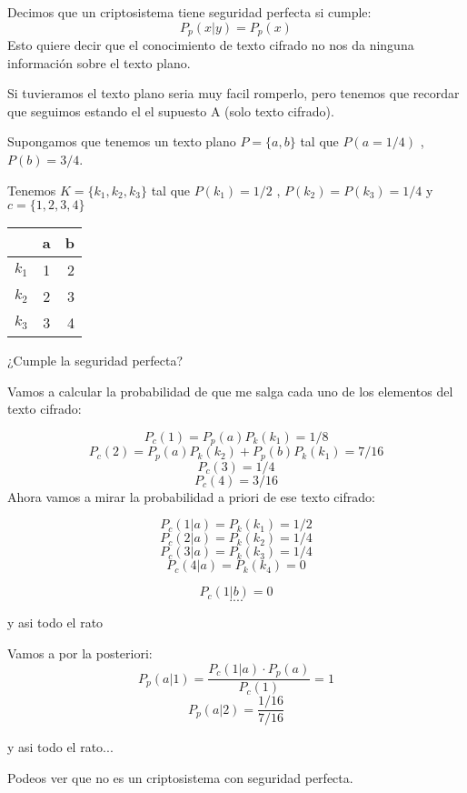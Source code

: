 \begin{defn}
	Decimos que un criptosistema tiene seguridad perfecta si cumple:
	$$P_p(x|y) = P_p(x)$$
	Esto quiere decir que el conocimiento de texto cifrado no nos da ninguna información sobre el texto plano.
\end{defn}

 Si tuvieramos el texto plano seria muy facil romperlo, pero tenemos que recordar que seguimos estando el el supuesto A (solo texto cifrado).

\begin{example}
	Supongamos que tenemos un texto plano $P=\{a,b\}$ tal que $P(a = 1/4)$ , $P(b) = 3/4$.
	
	Tenemos $K=\{k_1,k_2,k_3\}$ tal que $P(k_1) = 1/2$ , $P(k_2) = P(k_3) = 1/4$ y $c = \{1,2,3,4\}$

	
\begin{center}
		
	\begin{tabular}{l | c  r}
		  & a & b\\
		\hline
		$k_1$ & 1 & 2 \\
		$k_2$ & 2 & 3 \\
		$k_3$ & 3 & 4 \\
	\end{tabular}
\end{center}
	
		¿Cumple la seguridad perfecta?
		
		Vamos a calcular la probabilidad de que me salga cada uno de los elementos del texto cifrado:
	
	$$P_c(1) = P_p(a) P_k(k_1) = 1/8$$
	$$P_c(2) = P_p(a) P_k(k_2) + P_p(b) P_k(k_1) = 7/16$$
	$$P_c(3)= 1/4$$
	$$P_c(4) = 3/16$$
	Ahora vamos a mirar la probabilidad a priori de ese texto cifrado:
	
	$$P_c(1|a) = P_k(k_1) = 1/2$$
	$$P_c(2|a) = P_k(k_2) = 1/4$$
	$$P_c(3|a) = P_k(k_3) = 1/4$$
	$$P_c(4|a) = P_k(k_4) = 0$$
	
	$$P_c(1|b) = 0$$
	$$....$$
	
	y asi todo el rato
	
	Vamos a por la posteriori:
	$$P_p(a|1) = \frac{P_c(1|a) \cdot P_p(a)}{P_c(1)} = 1$$
	$$P_p(a|2) = \frac{1/16}{7/16}$$
	
	y asi todo el rato...
	
	Podeos ver que no es un criptosistema con seguridad perfecta.
\end{example}


